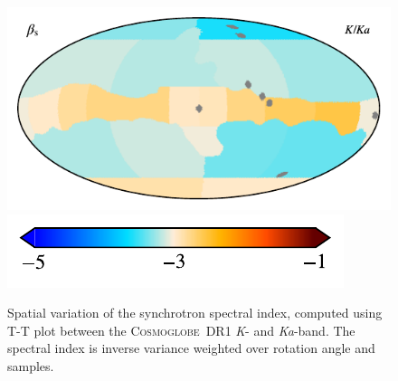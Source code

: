 \documentclass[twocolumn]{../../common/aa}
\newcommand{\Cosmoglobe}{\textsc{Cosmoglobe}}
\newcommand{\K}[0]{\textit K}
\newcommand{\Ka}[0]{\textit{Ka}}
\begin{document}
\begin{figure}
	\centering
	\includegraphics{figures/TT_map_CG_KKa.pdf}\vspace{-0.25cm}\\
	\hspace{0.25cm}\includegraphics{figures/cbar_beta_wide.pdf}
	\caption{Spatial variation of the synchrotron spectral index, computed using T-T plot between the \Cosmoglobe\ DR1 \K- and \Ka-band. The spectral index is inverse variance weighted over rotation angle and samples.}
        \label{fig:beta_map}
\end{figure}


\end{document}

